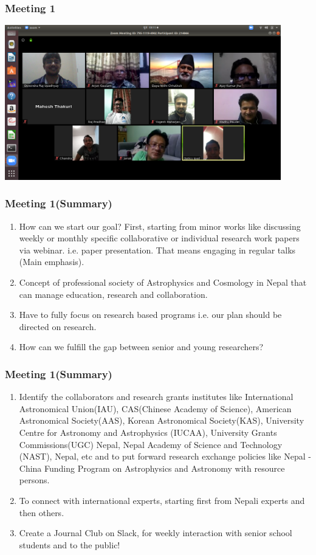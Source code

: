 \documentclass{beamer}
\begin{document}
\begin{frame}
\frametitle{\bf Meeting 1}
\centering
\includegraphics[width=12cm]{Astro}
\end{frame}

	\begin{frame}
\frametitle{\bf  Meeting 1(Summary)}	
\begin{enumerate}
	\bf 
\item \color{red}  How can we start our goal?
First, starting from minor works like discussing weekly or monthly specific
collaborative or individual research work papers via webinar. i.e. paper
presentation. That means engaging in regular talks (Main emphasis).
\item \color{blue} Concept of professional society of Astrophysics and Cosmology in Nepal
that can manage education, research and collaboration.
\item \color{red} Have to fully focus on research based programs i.e. our plan should be
directed on research.
\item \color{blue}How can we fulfill the gap between senior and young researchers?

\end{enumerate}
\end{frame}

	\begin{frame}
\frametitle{\bf  Meeting 1(Summary)}	
\begin{enumerate}
	\bf 
	\item \color{red} Identify the collaborators and research grants institutes like International
	Astronomical Union(IAU), CAS(Chinese Academy of Science), American
	Astronomical Society(AAS), Korean Astronomical Society(KAS),
	University Centre for Astronomy and Astrophysics (IUCAA), University
	Grants Commissions(UGC) Nepal, Nepal Academy of Science and
	Technology (NAST), Nepal, etc and to put forward research exchange
	policies like Nepal - China Funding Program on Astrophysics and
	Astronomy with resource persons.
	\item \color{blue} To connect with international experts, starting first from Nepali experts
	and then others.
	\item \color{red} Create a Journal Club on Slack, for weekly interaction with senior school
	students and to the public!
	
\end{enumerate}
\end{frame}
\end{document}
